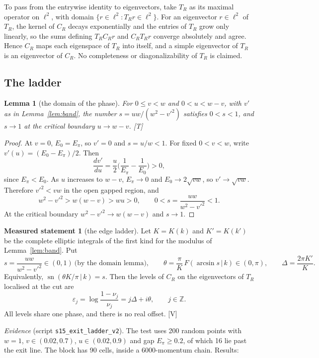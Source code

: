 \documentclass[11pt]{article}
\newtheorem*{lemma*}{Lemma}
\theoremstyle{definition}
\newtheorem{statement}[theorem]{Measured statement}
\newcommand{\grade}[1]{\textsf{\small[#1]}}
\newcommand{\sn}{\operatorname{sn}}
\begin{document}
To pass from the entrywise identity to eigenvectors, take $T_R$ as its maximal operator on $\ell^2$, with domain $\{r\in\ell^2: T_Rr\in\ell^2\}$. For an eigenvector $r\in\ell^2$ of $T_R$, the kernel of $C_R$ decays exponentially and the entries of $T_R$ grow only linearly, so the sums defining $T_RC_Rr$ and $C_RT_Rr$ converge absolutely and agree. Hence $C_R$ maps each eigenspace of $T_R$ into itself, and a simple eigenvector of $T_R$ is an eigenvector of $C_R$. No completeness or diagonalizability of $T_R$ is claimed.

\subsection{The ladder}
\begin{lemma*}[the domain of the phase]
For $0\le v<w$ and $0<u<w-v$, with $v'$ as in Lemma~\ref{lem:band}, the number $s=uw/(w^2-v'^2)$ satisfies $0<s<1$, and $s\to1$ at the critical boundary $u\to w-v$. \grade{T}
\end{lemma*}
\begin{proof}
At $v=0$, $E_0=E_\pi$, so $v'=0$ and $s=u/w<1$. For fixed $0<v<w$, write $v'(u)=(E_0-E_\pi)/2$. Then
\[
\frac{dv'}{du}=\frac u2\Big(\frac1{E_\pi}-\frac1{E_0}\Big)>0,
\]
since $E_\pi<E_0$. As $u$ increases to $w-v$, $E_\pi\to0$ and $E_0\to2\sqrt{vw}$, so $v'\to\sqrt{vw}$. Therefore $v'^2<vw$ in the open gapped region, and
\[
w^2-v'^2>w(w-v)>wu>0,\qquad 0<s=\frac{uw}{w^2-v'^2}<1.
\]
At the critical boundary $w^2-v'^2\to w(w-v)$ and $s\to1$.
\end{proof}
\begin{statement}[the edge ladder]\label{st:ladder}
Let $K=K(k)$ and $K'=K(k')$ be the complete elliptic integrals of the first kind for the modulus of Lemma~\ref{lem:band}. Put
\[
s=\frac{uw}{w^2-v'^2}\in(0,1)\ \text{(by the domain lemma)},\qquad \theta=\frac{\pi}{K}\,F(\arcsin s\,|\,k)\in(0,\pi),\qquad \Delta=\frac{2\pi K'}{K}.
\]
Equivalently, $\sn(\theta K/\pi\,|\,k)=s$. Then the levels of $C_R$ on the eigenvectors of $T_R$ localised at the cut are
\[
\varepsilon_j=\log\frac{1-\nu_j}{\nu_j}=j\Delta+i\theta,\qquad j\in\mathbb Z.
\]
All levels share one phase, and there is no real offset. \grade{V}
\end{statement}
\noindent\emph{Evidence} (script \texttt{s15\_exit\_ladder\_v2}). The test uses 200 random points with $w=1$, $v\in(0.02,0.7)$, $u\in(0.02,0.9)$ and gap $E_\pi\ge0.2$, of which 16 lie past the exit line. The block has 90 cells, inside a $6000$-momentum chain. Results:
\end{document}
